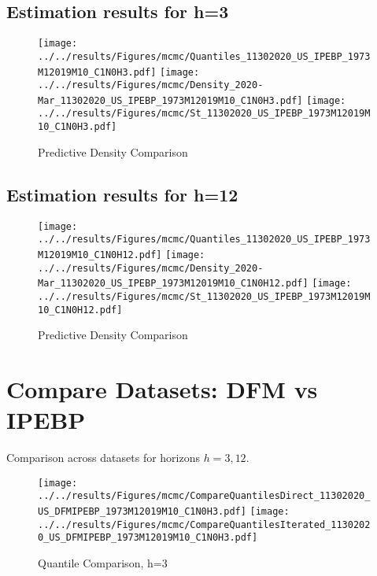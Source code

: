 \documentclass[12pt]{article}
\numberwithin{table}{subsection}
\numberwithin{figure}{section}
\begin{document}
\subsection{Estimation results for h=3}

\begin{figure}[htb!]
	\caption{Predictive Density Comparison}
	\centering
	\texttt{[image: ../../results/Figures/mcmc/Quantiles\_11302020\_US\_IPEBP\_1973M12019M10\_C1N0H3.pdf]}
	\texttt{[image: ../../results/Figures/mcmc/Density\_2020-Mar\_11302020\_US\_IPEBP\_1973M12019M10\_C1N0H3.pdf]}
	\texttt{[image: ../../results/Figures/mcmc/St\_11302020\_US\_IPEBP\_1973M12019M10\_C1N0H3.pdf]}
\end{figure}


\clearpage
\subsection{Estimation results for h=12}

\begin{figure}[htb!]
	\caption{Predictive Density Comparison}
	\centering
	\texttt{[image: ../../results/Figures/mcmc/Quantiles\_11302020\_US\_IPEBP\_1973M12019M10\_C1N0H12.pdf]}
	\texttt{[image: ../../results/Figures/mcmc/Density\_2020-Mar\_11302020\_US\_IPEBP\_1973M12019M10\_C1N0H12.pdf]}
	\texttt{[image: ../../results/Figures/mcmc/St\_11302020\_US\_IPEBP\_1973M12019M10\_C1N0H12.pdf]}
\end{figure}

\clearpage
\section{Compare Datasets: DFM vs IPEBP}
Comparison across datasets for horizons $h=3, 12$.
\begin{figure}[htb!]
	\caption{Quantile Comparison, h=3}
	\centering
	\texttt{[image: ../../results/Figures/mcmc/CompareQuantilesDirect\_11302020\_US\_DFMIPEBP\_1973M12019M10\_C1N0H3.pdf]}
	\texttt{[image: ../../results/Figures/mcmc/CompareQuantilesIterated\_11302020\_US\_DFMIPEBP\_1973M12019M10\_C1N0H3.pdf]}
\end{figure}
\end{document}
